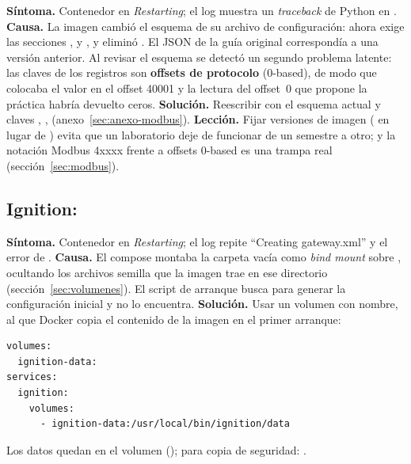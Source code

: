 \textbf{Síntoma.} Contenedor en \emph{Restarting}; el log muestra un \emph{traceback} de Python en . \textbf{Causa.} La imagen  cambió el esquema de su archivo de configuración: ahora exige las secciones ,  y , y eliminó . El JSON de la guía original correspondía a una versión anterior. Al revisar el esquema se detectó un segundo problema latente: las claves de los registros son \textbf{offsets de protocolo} (0-based), de modo que  colocaba el valor en el offset 40001 y la lectura del offset~0 que propone la práctica habría devuelto ceros. \textbf{Solución.} Reescribir  con el esquema actual y claves , ,  (anexo~\ref{sec:anexo-modbus}). \textbf{Lección.} Fijar versiones de imagen ( en lugar de ) evita que un laboratorio deje de funcionar de un semestre a otro; y la notación Modbus 4xxxx frente a offsets 0-based es una trampa real (sección~\ref{sec:modbus}).

\subsection{Ignition: }

\textbf{Síntoma.} Contenedor en \emph{Restarting}; el log repite ``Creating gateway.xml'' y el error de . \textbf{Causa.} El compose montaba la carpeta vacía  como \emph{bind mount} sobre , ocultando los archivos semilla que la imagen trae en ese directorio (sección~\ref{sec:volumenes}). El script de arranque busca  para generar la configuración inicial y no lo encuentra. \textbf{Solución.} Usar un volumen con nombre, al que Docker copia el contenido de la imagen en el primer arranque:

\begin{lstlisting}[style=yaml]
volumes:
  ignition-data:
services:
  ignition:
    volumes:
      - ignition-data:/usr/local/bin/ignition/data
\end{lstlisting}

Los datos quedan en el volumen  (); para copia de seguridad: .

